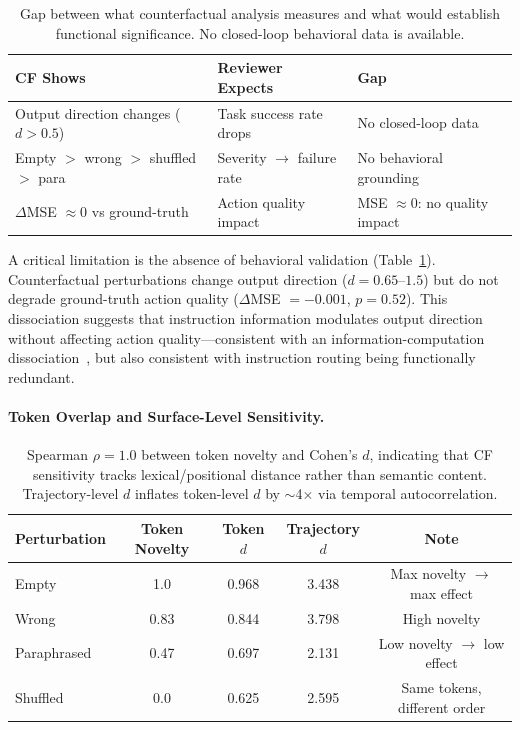 \documentclass[letterpaper]{article}
\begin{document}
\begin{table}[h]
\centering
\caption{Gap between what counterfactual analysis measures and what would establish functional significance. No closed-loop behavioral data is available.}
\label{tab:behavioral_gap}
\begin{tabular}{lll}
\toprule
CF Shows & Reviewer Expects & Gap \\
\midrule
Output direction changes ($d > 0.5$) & Task success rate drops & No closed-loop data \\
Empty $>$ wrong $>$ shuffled $>$ para & Severity $\to$ failure rate & No behavioral grounding \\
$\Delta$MSE $\approx 0$ vs ground-truth & Action quality impact & MSE $\approx 0$: no quality impact \\
\bottomrule
\end{tabular}
\end{table}

A critical limitation is the absence of behavioral validation (Table~\ref{tab:behavioral_gap}). Counterfactual perturbations change output direction ($d = 0.65$--$1.5$) but do not degrade ground-truth action quality ($\Delta$MSE $= -0.001$, $p = 0.52$). This dissociation suggests that instruction information modulates output direction without affecting action quality---consistent with an information-computation dissociation~\citep{hewitt2019designing}, but also consistent with instruction routing being functionally redundant.

\paragraph{Token Overlap and Surface-Level Sensitivity.}

\begin{table}[h]
\centering
\caption{Spearman $\rho = 1.0$ between token novelty and Cohen's $d$, indicating that CF sensitivity tracks lexical/positional distance rather than semantic content. Trajectory-level $d$ inflates token-level $d$ by $\sim$4$\times$ via temporal autocorrelation.}
\label{tab:token_overlap}
\begin{tabular}{lcccc}
\toprule
Perturbation & Token Novelty & Token $d$ & Trajectory $d$ & Note \\
\midrule
Empty & 1.0 & 0.968 & 3.438 & Max novelty $\to$ max effect \\
Wrong & 0.83 & 0.844 & 3.798 & High novelty \\
Paraphrased & 0.47 & 0.697 & 2.131 & Low novelty $\to$ low effect \\
Shuffled & 0.0 & 0.625 & 2.595 & Same tokens, different order \\
\bottomrule
\end{tabular}
\end{table}
\end{document}
